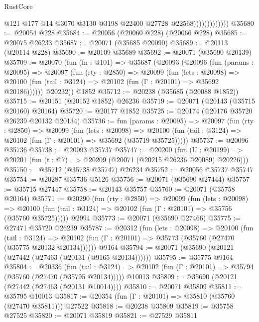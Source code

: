 \begin{lexlean}{RustCore}
\begin{coremodule}
                              @121
                              @177
                              @14
                              @3070
                              @3130
                              @3198
                              @22400
                              @27728
                              @22568)))))))))))))
@35680 := @20054 @228
@35684 := @20056 (@20060 @228) (@20066 @228)
@35685 := @20075 @26233
@35687 := @20071 (@35685 @20090)
@35689 := @20113 (@20114 @228)
@35690 := @20109 @35689
@35692 := @20071 (@35690 @20139)
@35709 := @20070
    (fun (fn : @101) =>
    @35687
      (@20093
        (@20096
          (fun (params : @20095) =>
          @20097
            (fun (rty : @2850) =>
            @20099
              (fun (lets : @20098) =>
              @20100 (fun (tail : @3124) => @20102 (fun (Γ : @20101) => @35692 @20186))))))
        @20232))
    @1852
@35712 := @20238 (@35685 (@20088 @1852))
@35715 := @20151 (@20152 @1852) @26236
@35719 := @20071 (@20143 (@35715 @20160) @20164)
@35720 := @20177 @1852
@35725 := @20174 (@20176 @35720 @26239 @20132 @20134)
@35736 := fun (params : @20095) =>
  @20097
    (fun (rty : @2850) =>
    @20099
      (fun (lets : @20098) =>
      @20100 (fun (tail : @3124) => @20102 (fun (Γ : @20101) => @35692 (@35719 @35725)))))
@35737 := @20096 @35736
@35738 := @20093 @35737
@35747 := @20200
    (fun (U : @20199) => @20201 (fun (t : @7) => @20209 (@20071 (@20215 @26236 @20089) @20226)))
@35750 := @35712 (@35738 @35747) @26234
@35752 := @20056 @35737 @35747
@35754 := @20287 @35736 @5126
@35756 := @20071 (@35690 @27444)
@35757 := @35715 @27447
@35758 := @20143 @35757
@35760 := @20071 (@35758 @20164)
@35771 := @20290
    (fun (rty : @2850) =>
    @20099
      (fun (lets : @20098) =>
      @20100 (fun (tail : @3124) => @20102 (fun (Γ : @20101) => @35756 (@35760 @35725)))))
    @2994
@35773 := @20071 (@35690 @27466)
@35775 := @27471 @35720 @26239
@35787 := @20312
    (fun (lets : @20098) =>
    @20100
      (fun (tail : @3124) =>
      @20102 (fun (Γ : @20101) => @35773 (@35760 (@27470 (@35775 @20132 @20134))))))
    @9164
@35794 := @20071 (@35690 (@20121 (@27442 (@27463 (@20131 (@9165 @20134))))))
@35795 := @35775 @9164
@35804 := @20336
    (fun (tail : @3124) => @20102 (fun (Γ : @20101) => @35794 (@35760 (@27470 (@35795 @20134)))))
    @10013
@35809 := @35690 (@20121 (@27442 (@27463 (@20131 @10014))))
@35810 := @20071 @35809
@35811 := @35795 @10013
@35817 := @20354 (fun (Γ : @20101) => @35810 (@35760 (@27470 @35811))) @27522
@35818 := @20238 @35809
@35819 := @35758 @27525
@35820 := @20071 @35819
@35821 := @27529 @35811

\end{coremodule}
\end{lexlean}
